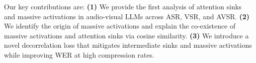\documentclass{article}
\begin{document}
Our key contributions are: \textbf{(1)} We provide the first analysis of attention sinks and massive activations in audio-visual LLMs across ASR, VSR, and AVSR. \textbf{(2)} We identify the origin of massive activations and explain the co-existence of massive activations and attention sinks via cosine similarity. \textbf{(3)} We introduce a novel decorrelation loss that mitigates intermediate sinks and massive activations while improving WER at high compression rates.
\end{document}
